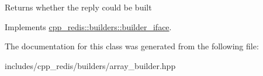 \begin{DoxyReturn}{Returns}
whether the reply could be built 
\end{DoxyReturn}


Implements \hyperlink{classcpp__redis_1_1builders_1_1builder__iface_a40db9a31d4ea1771777e74146d31e12d}{cpp\+\_\+redis\+::builders\+::builder\+\_\+iface}.



The documentation for this class was generated from the following file\+:\begin{DoxyCompactItemize}
\item 
includes/cpp\+\_\+redis/builders/array\+\_\+builder.\+hpp\end{DoxyCompactItemize}
